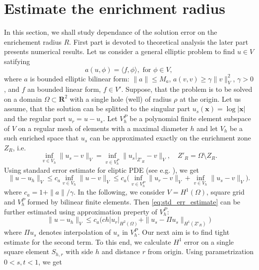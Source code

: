 \documentclass[preprint,12pt]{elsarticle}
\def\vc#1{\mathbf{\boldsymbol{#1}}}     %
\def\abs#1{\left|#1\right|}
\def\norm#1{\| #1 \|}
\def\abs#1{| #1 |}
\newcommand{\R}{\mathbf{R}}
\begin{document}
\section{Estimate the enrichment radius}
In this section, we shall study dependance of the solution error on the enrichement radius $R$. First part is devoted to 
theoretical analysis the later part presents numerical results.
Let us consider a general elliptic problem to find $u\in V$ satifying
\[
   a(u, \phi) = \langle f, \phi \rangle, \text{ for } \phi \in V,
\]
where $a$ is bounded elliptic bilinear form: $\norm{a}\le M_a$, $a(v, v) \ge \gamma \norm{v}_V^2$, $\gamma>0$, and $f$ an bounded linear form, $f\in V'$. 
Suppose, that the problem is to be solved on a domain $\Omega \subset \R^2$ with a single hole (well) of radius $\rho$ at the origin. 
Let us assume, that the solution can be splitted to the singular part $u_s(\vc x)= \log |\vc x|$ and the regular part $u_r=u-u_s$.
Let $V^P_h$ be a polynomial finite element subspace of $V$ on a regular mesh of elements with a maximal diameter $h$
and let $V_h$ be a such enriched space that $u_s$ can be approximated exactly on the enrichment zone $Z_R$, i.e.
\[
   \inf_{v\in V_h} \norm{u_s - v}_V = \inf_{v\in V^P_h} \norm{u_s|_{Z'_R} - v}_V, \quad Z'_R = \Omega\setminus Z_R.
\]
Using standard error estimate for eliptic PDE (see e.g. \cite{arnold_lecture_2009}), we get
\begin{equation}
    \label{eq:std_err_estimate}
    \norm{u - u_h}_{V} \le c_a \inf_{v \in V_h} \norm{u - v}_{V} 
    \le c_a \big(\inf_{v \in V^P_h} \norm{u_r - v}_{V} + \inf_{v \in V_h} \norm{u_s - v}_{V} \big).   
\end{equation}
where $c_a=1+\norm{a}/\gamma$.
In the following, we consider $V=H^1(\Omega)$, square grid and $V^P_h$ formed by bilinear finite elements. 
Then \eqref{eq:std_err_estimate} can be further estimated using approximation preperty of $V^P_h$:
\begin{equation}
    \label{eq:particular_estimate}
    \norm{u - u_h}_{V} \le c_a \big(c h \abs{u_r}_{H^2(\Omega)} + \norm{u_s - \Pi u_s}_{H^1(Z'_R)} \big)   
\end{equation}
where $\Pi u_s$ denotes interpolation of $u_s$ in $V^P_h$. Our next aim is to find tight estimate for the second term.
To this end, we calculate $H^1$ error on a single square element $S_{h,r}$ with side $h$ and distance $r$ from origin.
Using parametrization $0<s,t<1$,  we get
\end{document}
